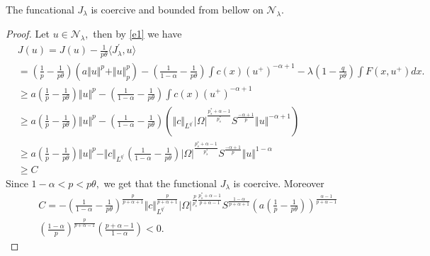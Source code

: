 \documentclass[10pt,twoside,reqno,centertags,draft]{amsart}
\begin{document}
\begin{lemma} \label{l5}
The funcational $ J_{\lambda}$ is coercive and bounded from bellow on $ \mathcal{N}_{\lambda}.$ 
\end{lemma}
\begin{proof}
Let $ u \in \mathcal{N}_{\lambda},$ then by \ref{e1} we have
\footnotesize
\begin{equation*}
\begin{aligned}
&J(u) =J(u) -\frac{1}{p\theta} \langle J_{\lambda}^{\prime}, u \rangle\\
     &= \left( \frac{1}{p} -\frac{1}{p\theta}\right)\left(a \Vert u \Vert^p + \Vert u \Vert^{p}_p\right) -\left(\frac{1}{1 -\alpha} - \frac{1}{p\theta} \right)\int c(x)(u^+)^{-\alpha+1} -\lambda \left( 1 -\frac{q}{p\theta}\right)\int F(x,u^+)dx.\\
     &\geq  a\left( \frac{1}{p} -\frac{1}{p\theta}\right)\Vert u \Vert^p -\left(\frac{1}{1 -\alpha} - \frac{1}{p\theta} \right)\int c(x)(u^+)^{-\alpha+1}\\
     &\geq  a\left( \frac{1}{p} -\frac{1}{p\theta}\right)\Vert u \Vert^p -\left(\frac{1}{1 -\alpha} - \frac{1}{p\theta} \right)\left( \Vert c \Vert_{L^{q^{\prime}}}\vert \Omega \vert^{\frac{p_s^* +\alpha -1}{p_s^*}}S^{\frac{-\alpha+1}{p}} \Vert u \Vert^{-\alpha+1}\right)\\
     &\geq  a\left( \frac{1}{p} -\frac{1}{p\theta}\right)\Vert u \Vert^p -\Vert c \Vert_{L^{q^{\prime}}}\left(\frac{1}{1 -\alpha} - \frac{1}{p\theta} \right)\vert \Omega \vert^{\frac{p_s^* +\alpha -1}{p_s^*}}S^{\frac{-\alpha+1}{p}} \Vert u \Vert^{1 -\alpha}\\
     &\geq C
\end{aligned}
\end{equation*}
Since $ 1 -\alpha < p < p\theta,$ we get that the functional $ J_{\lambda}$ is coercive. Moreover
{\scriptsize
\begin{equation*}
\begin{aligned}
&C =-\left(\frac{1}{1 -\alpha} - \frac{1}{p\theta} \right)^{\frac{p}{p +\alpha +1}}\Vert c \Vert_{L^{q^{\prime}}}^{\frac{p}{p +\alpha+1}}\vert \Omega \vert^{\frac{p}{p_s^*}\frac{p_s^* +\alpha -1}{p +\alpha -1}}S^{\frac{1 -\alpha}{p +\alpha +1}}\left( a\left( \frac{1}{p} -\frac{1}{p\theta}\right) \right)^{\frac{\alpha -1}{p +\alpha -1}}\\
&\left(\frac{1 -\alpha}{p}\right)^{\frac{p}{p +\alpha -1}}\left(\frac{p +\alpha -1}{1 -\alpha}\right) < 0.
\end{aligned}
\end{equation*}
}
\end{proof}
\end{document}

